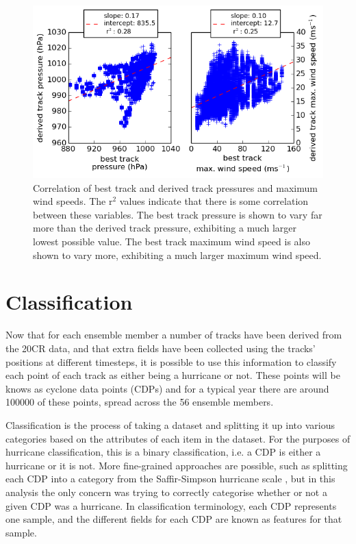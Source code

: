\documentclass[pdftex,12pt,a4paper]{report}
\begin{document}
\begin{figure}[ht!]
    \centering
    \includegraphics[width=\textwidth]{figures/press_max_ws_corr_2005}
    \vspace{-10pt}
    \caption{Correlation of best track and derived track pressures and maximum wind speeds. The
        r$^2$ values indicate that there is some correlation between these variables. The best track
        pressure is shown to vary far more than the derived track pressure, exhibiting a much larger lowest
        possible value. The best track maximum wind speed is also shown to vary more, exhibiting a much
        larger maximum wind speed. }
    \label{fig:press_max_ws_corr_2005}
\end{figure}

\newpage
\section{Classification}
\label{sec:classification}

Now that for each ensemble member a number of tracks have been derived from the 20CR data, and that
extra fields have been collected using the tracks' positions at different timesteps, it is possible
to use this information to classify each point of each track as either being a hurricane or not.
These points will be knows as cyclone data points (CDPs) and for a typical year there are around
100000 of these points, spread across the 56 ensemble members.

Classification is the process of taking a dataset and splitting it up into various categories based
on the attributes of each item in the dataset. For the purposes of hurricane classification, this is
a binary classification, i.e. a CDP is either a hurricane or it is not. More fine-grained approaches
are possible, such as splitting each CDP into a category from the Saffir-Simpson hurricane scale
\parencite{simpson1974hurricane}, but in this analysis the only concern was trying to correctly categorise whether or
not a given CDP was a hurricane. In classification terminology, each CDP represents one sample, and
the different fields for each CDP are known as features for that sample.
\end{document}
